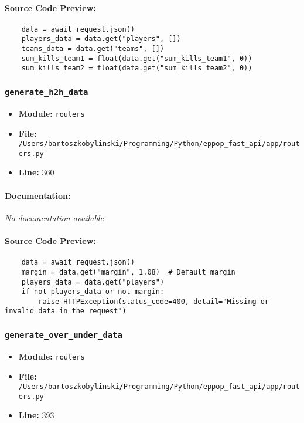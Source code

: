 \documentclass[11pt,a4paper]{article}
\begin{document}
\paragraph{Source Code Preview:}
\begin{verbatim}
    data = await request.json()
    players_data = data.get("players", [])
    teams_data = data.get("teams", [])
    sum_kills_team1 = float(data.get("sum_kills_team1", 0))
    sum_kills_team2 = float(data.get("sum_kills_team2", 0))
\end{verbatim}

\vspace{1em}
\subsubsection{\texttt{generate\_h2h\_data}}

\begin{itemize}
    \item \textbf{Module:} \texttt{routers}
    \item \textbf{File:} \texttt{/Users/bartoszkobylinski/Programming/Python/eppop\_fast\_api/app/routers.py}
    \item \textbf{Line:} 360
\end{itemize}

\paragraph{Documentation:} \textit{No documentation available}

\paragraph{Source Code Preview:}
\begin{verbatim}
    data = await request.json()
    margin = data.get("margin", 1.08)  # Default margin
    players_data = data.get("players")
    if not players_data or not margin:
        raise HTTPException(status_code=400, detail="Missing or invalid data in the request")
\end{verbatim}

\vspace{1em}
\subsubsection{\texttt{generate\_over\_under\_data}}

\begin{itemize}
    \item \textbf{Module:} \texttt{routers}
    \item \textbf{File:} \texttt{/Users/bartoszkobylinski/Programming/Python/eppop\_fast\_api/app/routers.py}
    \item \textbf{Line:} 393
\end{itemize}
\end{document}
